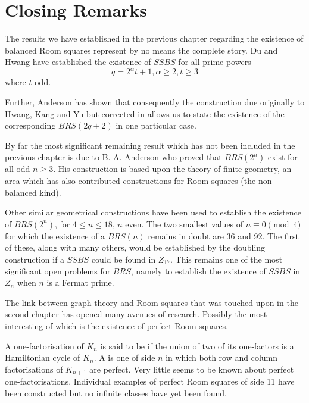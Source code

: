 \chapter{Closing Remarks}
\label{ch:closing-remarks}

The results we have established in the previous chapter regarding the existence of balanced Room squares represent by no means the complete story.
Du and Hwang
\cite{duExistenceSymmetricSkew1988}
have established the existence of $SSBS$ for all prime powers
\begin{equation}
q = 2^{\alpha}t + 1, \alpha \geq 2, t \geq 3
\end{equation}
where $t$ odd.

Further, Anderson has shown that consequently the construction due originally to Hwang, Kang and Yu
\cite{hwangCompleteBalancedHowell1984}
but corrected in
\cite{andersonConstructionBalancedRoom1999}
allows us to state the existence of the corresponding $BRS(2q + 2)$ in one particular case.

By far the most significant remaining result which has not been included in the previous chapter is due to B. A. Anderson who proved that $BRS(2^n)$ exist for all odd $n \geq 3$.
His construction is based upon the theory of finite geometry, an area which has also contributed constructions for Room squares (the non-balanced kind).

Other similar geometrical constructions have been used to establish the existence of $BRS(2^n)$, for $4 \leq n \leq 18$, $n$ even.
The two smallest values of $n \equiv 0 \pmod 4$ for which the existence of a $BRS(n)$ remains in doubt are 36 and 92.
The first of these, along with many others, would be established by the doubling construction if a $SSBS$ could be found in $Z_{17}$.
This remains one of the most significant open problems for $BRS$, namely to establish the existence of $SSBS$ in $Z_n$ when $n$ is a Fermat prime.

The link between graph theory and Room squares that was touched upon in the second chapter has opened many avenues of research.
Possibly the most interesting of which is the existence of perfect Room squares.

A one-factorisation of $K_n$ is said to be  if the union of two of its one-factors is a Hamiltonian cycle of $K_n$.
A  is one of side $n$ in which both row and column factorisations of $K_{n + 1}$ are perfect.
Very little seems to be known about perfect one-factorisations.
Individual examples of perfect Room squares of side 11 have been constructed but no infinite classes have yet been found.
